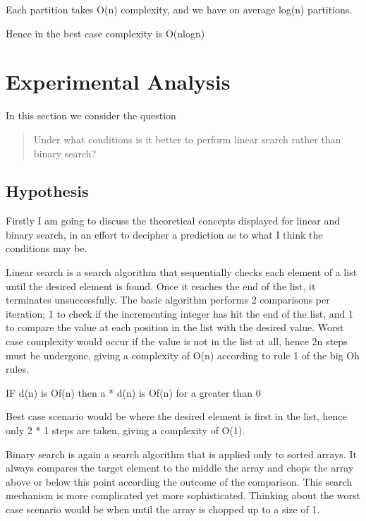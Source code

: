 \documentclass{article}
\begin{document}
Each partition takes O(n) complexity, and we have on average log(n) partitions.\newline

Hence in the best case complexity is O(nlogn)
\newline


\section{Experimental Analysis}
\label{sec:initialExperiments}

In this section we consider the question
	\begin{quote}
	Under what conditions is it better to perform linear search rather than binary search?
	\end{quote}

\subsection{Hypothesis}

Firstly I am going to discuss the theoretical concepts displayed for linear and binary search, in an effort to decipher a prediction as to what I think the conditions may be.\par

Linear search is a search algorithm that sequentially checks each element of a list until the desired element is found. Once it reaches the end of the list, it terminates unsuccessfully. The basic algorithm performs 2 comparisons per iteration; 1 to check if the incrementing integer has hit the end of the list, and 1 to compare the value at each position in the list with the desired value. Worst case complexity would occur if the value is not in the list at all, hence 2n steps must be undergone, giving a complexity of O(n) according to rule 1 of the big Oh rules.\par

IF d(n) is Of(n) then a * d(n) is Of(n) for a greater than 0\newline


Best case scenario would be where the desired element is first in the list, hence only 2 * 1 steps are taken, giving a complexity of O(1).\newline


Binary search is again a search algorithm that is applied only to sorted arrays. It always compares the target element to the middle the array and chops the array above or below this point according the outcome of the comparison. This search mechanism is more complicated yet more sophisticated. Thinking about the worst case scenario would be when until the array is chopped up to a size of 1.\par
\end{document}
